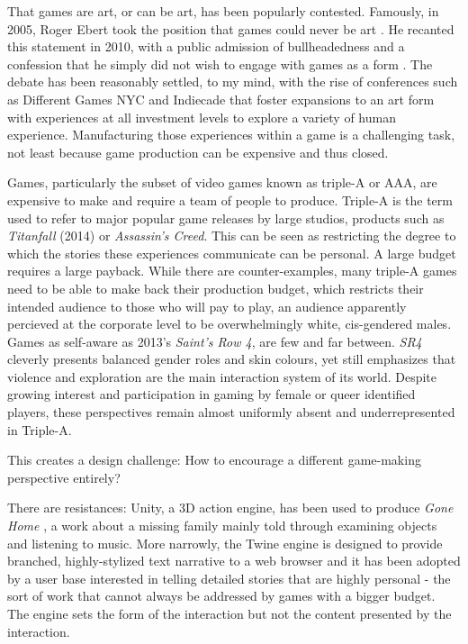 That games are art, or can be art, has been popularly contested. Famously, in 2005, Roger Ebert took the position that games could never be art \parencite{ebert1}. He recanted this statement in 2010, with a public admission of bullheadedness and a confession that he simply did not wish to engage with games as a form \parencite{ebert2}. The debate has been reasonably settled, to my mind, with the rise of conferences such as Different Games NYC and Indiecade that foster expansions to an art form with experiences at all investment levels to explore a variety of human experience. Manufacturing those experiences within a game is a challenging task, not least because game production can be expensive and thus closed. 

Games, particularly the subset of video games known as triple-A or AAA, are expensive to make and require a team of people to produce. Triple-A is the term used to refer to major popular game releases by large studios, products such as \textit{Titanfall} (2014) or \textit{Assassin's Creed}. This can be seen as restricting the degree to which the stories these experiences communicate can be personal. A large budget requires a large payback. While there are counter-examples, many triple-A games need to be able to make back their production budget, which restricts their intended audience to those who will pay to play, an audience apparently percieved at the corporate level to be overwhelmingly white, cis-gendered males. Games as self-aware  as 2013's \textit{Saint's Row 4}, \parencite{saintsrow} are few and far between. \textit{SR4} cleverly presents balanced gender roles and skin colours, yet still emphasizes that violence and exploration are the main interaction system of its world. Despite growing interest and participation in gaming by female or queer identified players, these perspectives remain almost uniformly absent and underrepresented in Triple-A.

This creates a design challenge: How to encourage a different game-making perspective entirely?

There are resistances: Unity, a 3D action engine, has been used to produce \textit{Gone Home} \parencite{fullbrightco}, a work about a missing family mainly told through examining objects and listening to music. More narrowly, the Twine engine is designed to provide branched, highly-stylized text narrative to a web browser and it has been adopted by a user base interested in telling detailed stories that are highly personal - the sort of work that cannot always be addressed by games with a bigger budget. The engine sets the form of the interaction but not the content presented by the interaction.

